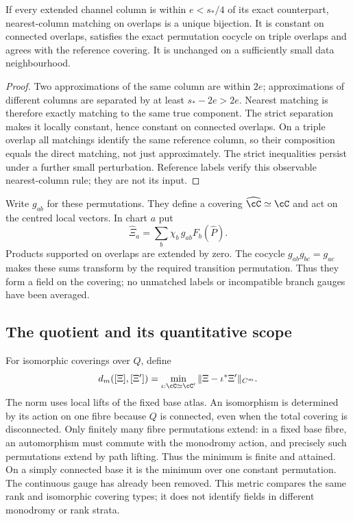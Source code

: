 \begin{lemma}
\label{lem:v83-match}
If every extended channel column is within $e<s_*/4$ of its exact
counterpart, nearest-column matching on overlaps is a unique bijection.
It is constant on connected overlaps, satisfies the exact permutation
cocycle on triple overlaps and agrees with the reference covering.
It is unchanged on a sufficiently small data neighbourhood.
\end{lemma}
\begin{proof}
Two approximations of the same column are within $2e$; approximations
of different columns are separated by at least $s_*-2e>2e$.
Nearest matching is therefore exactly matching to the same true
component. The strict separation makes it locally constant, hence
constant on connected overlaps. On a triple overlap all matchings
identify the same reference column, so their composition equals the
direct matching, not just approximately. The strict inequalities persist
under a further small perturbation. Reference labels verify this
observable nearest-column rule; they are not its input.
\end{proof}
Write $g_{ab}$ for these permutations. They define a covering
$\widehat\cC\simeq\cC$ and act on the centred local vectors. In chart
$a$ put
\begin{equation}\label{eq:v83-gluing}
 \widehat\Xi_a=\sum_b\chi_b\,g_{ab}F_b(\widehat P).
\end{equation}
Products supported on overlaps are extended by zero. The cocycle
$g_{ab}g_{bc}=g_{ac}$ makes these sums transform by the required
transition permutation. Thus they form a field on the covering;
no unmatched labels or incompatible branch gauges have been averaged.

\subsection{The quotient and its quantitative scope}
For isomorphic coverings over $Q$, define
\begin{equation}\label{eq:v83-quotient-metric}
 d_m([\Xi],[\Xi'])=
       \min_{\iota:\cC\simeq\cC'}\|\Xi-\iota^*\Xi'\|_{C^m}.
\end{equation}
The norm uses local lifts of the fixed base atlas. An isomorphism is
determined by its action on one fibre because $Q$ is connected, even
when the total covering is disconnected. Only finitely many fibre
permutations extend: in a fixed base fibre, an automorphism must commute
with the monodromy action, and precisely such permutations extend by
path lifting. Thus the minimum is finite and attained. On a simply
connected base it is the minimum over one constant permutation.
The continuous gauge has already been removed. This metric compares
the same rank and isomorphic covering types; it does not identify
fields in different monodromy or rank strata.

